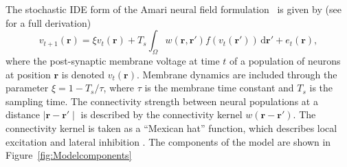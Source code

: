 \documentclass[11pt,draftcls,onecolumn,peerreview]{IEEEtran}
\begin{document}
The stochastic IDE form of the Amari neural field  formulation~\cite{Amari1977} is given by (see~\cite{Freestone2011} for a full derivation)
\begin{equation}\label{eq:DiscreteTimeModel}
	v_{t+1}\left(\mathbf{r}\right) = 
	\xi v_t\left(\mathbf{r}\right) + 
	T_s \int_\Omega { 
	    w\left(\mathbf{r},\mathbf{r'}\right)
	    f\left(v_t\left(\mathbf{r}'\right)\right) 
	\, \mathrm{d}\mathbf{r}'} 
	+ e_t\left(\mathbf{r}\right), 
\end{equation}
where the post-synaptic membrane voltage at time $t$ of a population of neurons at position $\mathbf r$ is denoted $v_t\left(\mathbf r\right)$. Membrane dynamics are included through the parameter $\xi=1-T_s/\tau$, where $\tau$ is the membrane time constant and $T_s$ is the sampling time. The connectivity strength between neural populations at a distance $\mid\mathbf{r}-\mathbf{r'}\mid$ is described by the connectivity kernel $w\left(\mathbf{r}-\mathbf{r}'\right)$. The connectivity kernel is taken as a ``Mexican hat'' function, which describes local excitation and lateral inhibition \cite{Amari1977,Atay2005}. The components of the model are shown in Figure~\ref{fig:Modelcomponents}
\end{document}

